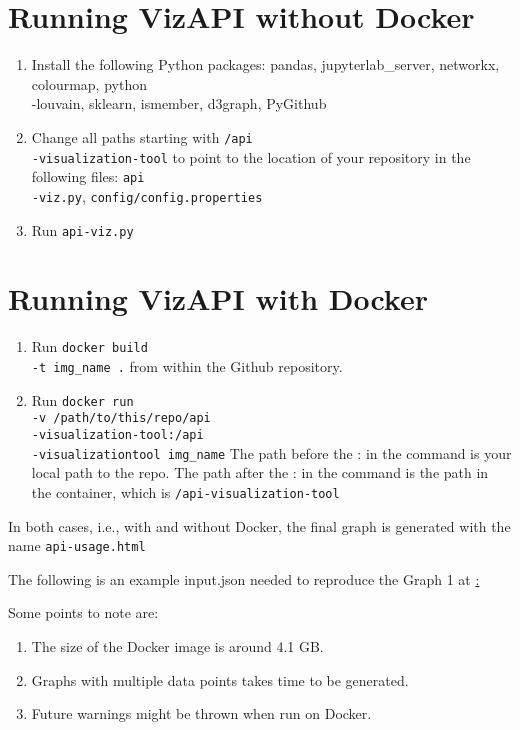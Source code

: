 \documentclass[conference]{IEEEtran}
\begin{document}
\section{Running VizAPI without Docker}
\begin{enumerate}
\item Install the following Python packages: pandas, jupyterlab\_server, networkx, colourmap, python\\-louvain, sklearn, ismember, d3graph, PyGithub
\item Change all paths starting with \texttt{/api\\-visualization-tool} to point to the location of your repository in the following files: \texttt{api\\-viz.py}, \texttt{config/config.properties}
\item Run \texttt{api-viz.py}
\end{enumerate}

\section{Running VizAPI with Docker}
\begin{enumerate}
\item Run \texttt{docker build \\-t img\_name .} 
from within the Github repository.
\item Run \texttt{docker run \\-v /path/to/this/repo/api\\-visualization-tool:/api\\-visualization\-tool img\_name} The path before the : in the command is your local path to the repo. The path after the : in the command is the path in the container, which is \texttt{/api-visualization-tool}
\end{enumerate}

In both cases, i.e., with and without Docker, the final graph is generated with the name \texttt{api-usage.html}

The following is an example input.json needed to reproduce the Graph 1 at \href{https://sruthivenkat.github.io/VizAPI-graph/}:


Some points to note are:
\begin{enumerate}
\item The size of the Docker image is around 4.1 GB.
\item Graphs with multiple data points takes time to be generated.
\item Future warnings might be thrown when run on Docker.
\end{enumerate}
\end{document}
